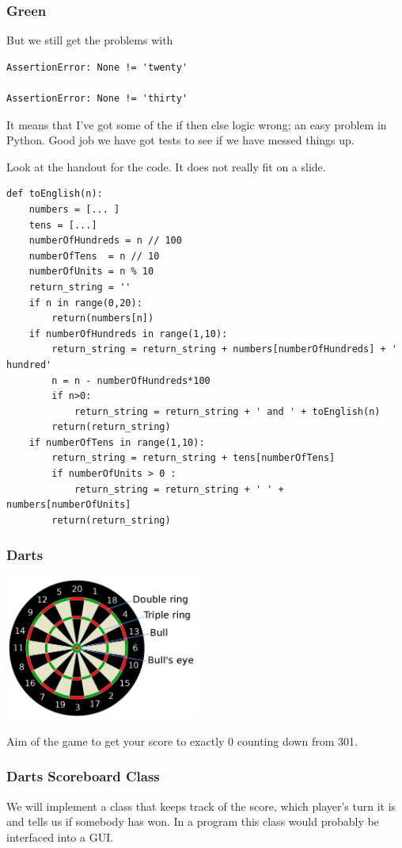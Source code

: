 \documentclass{beamer}
\begin{document}
\begin{frame}[fragile]
  \frametitle{Green}
But we still get the problems with 
\begin{verbatim}
AssertionError: None != 'twenty'

AssertionError: None != 'thirty'
\end{verbatim}
It means that I've got some of the if then else logic wrong; an easy
problem in Python. Good job we have got tests to see if we have messed
things up.

Look at the handout for the code. It does not really  fit on a slide.
\end{frame}
\begin{frame}[fragile]
  \begin{lstlisting}
def toEnglish(n):
    numbers = [... ] 
    tens = [...]
    numberOfHundreds = n // 100
    numberOfTens  = n // 10
    numberOfUnits = n % 10
    return_string = ''
    if n in range(0,20):
        return(numbers[n])
    if numberOfHundreds in range(1,10):
        return_string = return_string + numbers[numberOfHundreds] + ' hundred'
        n = n - numberOfHundreds*100
        if n>0:
            return_string = return_string + ' and ' + toEnglish(n)
        return(return_string)
    if numberOfTens in range(1,10):
        return_string = return_string + tens[numberOfTens]
        if numberOfUnits > 0 :
            return_string = return_string + ' ' + numbers[numberOfUnits]
        return(return_string)
  \end{lstlisting}
\end{frame}
\begin{frame}
\frametitle{Darts}

\begin{center}
    \includegraphics[height=1.86in,width=2.5in]{board.png}
\end{center}
Aim of the game to get your score to exactly 0 counting down from 301. 
\end{frame}
\begin{frame}
  \frametitle{Darts Scoreboard Class}

We will implement a class that keeps track of the score, which
player's turn it is and tells us if somebody has won. In a program
this class would probably be interfaced into a GUI. 
\end{frame}
\end{document}
